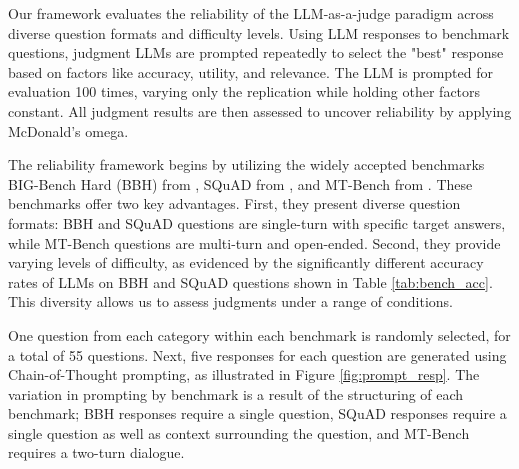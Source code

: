 \documentclass[11pt]{article}
\begin{document}
Our framework evaluates the reliability of the LLM-as-a-judge paradigm across diverse question formats and difficulty levels. Using LLM responses to benchmark questions, judgment LLMs are prompted repeatedly to select the "best" response based on factors like accuracy, utility, and relevance. The LLM is prompted for evaluation 100 times, varying only the replication while holding other factors constant. All judgment results are then assessed to uncover reliability by applying McDonald's omega.

The reliability framework begins by utilizing the widely accepted benchmarks BIG-Bench Hard (BBH) from \citet{suzgun2022challenging}, SQuAD from \citet{rajpurkar2016squad}, and MT-Bench from \citet{zheng2023judging}. These benchmarks offer two key advantages. First, they present diverse question formats: BBH and SQuAD questions are single-turn with specific target answers, while MT-Bench questions are multi-turn and open-ended. Second, they provide varying levels of difficulty, as evidenced by the significantly different accuracy rates of LLMs on BBH and SQuAD questions shown in Table \ref{tab:bench_acc}. This diversity allows us to assess judgments under a range of conditions.

One question from each category within each benchmark is randomly selected, for a total of 55 questions. Next, five responses for each question are generated using Chain-of-Thought prompting, as illustrated in Figure \ref{fig:prompt_resp}. The variation in prompting by benchmark is a result of the structuring of each benchmark; BBH responses require a single question, SQuAD responses require a single question as well as context surrounding the  question, and MT-Bench requires a two-turn dialogue.
\end{document}
